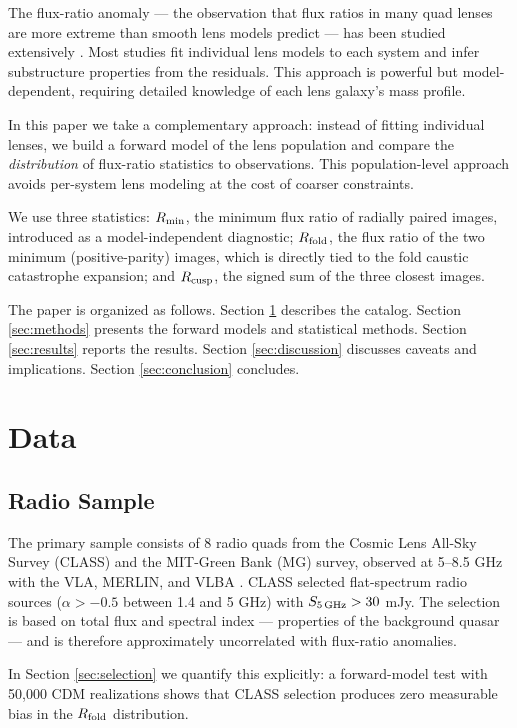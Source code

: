 \documentclass[12pt]{article}
\newcommand{\rfold}{\ensuremath{R_{\rm fold}}}
\newcommand{\rcusp}{\ensuremath{R_{\rm cusp}}}
\newcommand{\rmin}{\ensuremath{R_{\rm min}}}
\begin{document}
The flux-ratio anomaly --- the observation that flux ratios in many quad lenses are
more extreme than smooth lens models predict --- has been studied extensively
\cite[e.g.][]{KochanekDalal2004, Keeton2003, Xu2015, Nierenberg2017, Hsueh2020}.
Most studies fit individual lens models to each system and infer substructure
properties from the residuals. This approach is powerful but model-dependent,
requiring detailed knowledge of each lens galaxy's mass profile.

In this paper we take a complementary approach: instead of fitting individual lenses,
we build a forward model of the lens population and compare the \emph{distribution}
of flux-ratio statistics to observations. This population-level approach avoids
per-system lens modeling at the cost of coarser constraints.

We use three statistics:
\rmin{}, the minimum flux ratio of radially paired images,
introduced as a model-independent diagnostic;
\rfold{}, the flux ratio of the two minimum (positive-parity) images,
which is directly tied to the fold caustic catastrophe expansion; and
\rcusp{}, the signed sum of the three closest images.

The paper is organized as follows.
Section \ref{sec:data} describes the catalog.
Section \ref{sec:methods} presents the forward models and statistical methods.
Section \ref{sec:results} reports the results.
Section \ref{sec:discussion} discusses caveats and implications.
Section \ref{sec:conclusion} concludes.

\section{Data}
\label{sec:data}

\subsection{Radio Sample}
\label{sec:radio}

The primary sample consists of 8 radio quads from the Cosmic Lens All-Sky Survey
(CLASS) and the MIT-Green Bank (MG) survey, observed at 5--8.5 GHz with the VLA,
MERLIN, and VLBA \cite{Browne2003, Myers2003}.
CLASS selected flat-spectrum radio sources ($\alpha > -0.5$ between 1.4 and 5 GHz)
with $S_{\rm 5\,GHz} > 30$ mJy. The selection is based on total flux and spectral
index --- properties of the background quasar --- and is therefore approximately
uncorrelated with flux-ratio anomalies.

In Section \ref{sec:selection} we quantify this explicitly:
a forward-model test with 50,000 CDM realizations shows that CLASS selection
produces zero measurable bias in the \rfold{} distribution.
\end{document}
